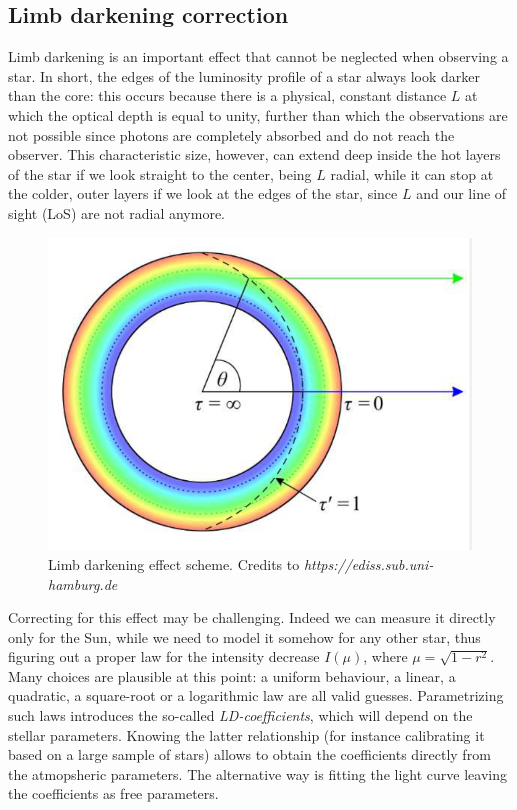 \documentclass[a4paper,11pt,twocolumn]{article}
\begin{document}

\subsection{Limb darkening correction}

Limb darkening is an important effect that cannot be neglected when observing a star.
In short, the edges of the luminosity profile 
of a star always look darker than the core: this occurs because there is a physical, constant 
distance $L$ at which the optical depth is equal to unity, further than which 
the observations are not possible since photons are completely absorbed and do not reach the observer. This characteristic size, 
however, can extend deep inside the hot layers of the star if we look straight 
to the center, being $L$ radial, while it can stop at the colder, outer layers 
if we look at the edges of the star, since $L$ and our line of sight (LoS) are not radial 
anymore.
\begin{figure}[H]
    \centering  
    \includegraphics[scale=0.25, angle=0]{../pictures/limb_darkening.png}
    \caption{Limb darkening effect scheme. Credits to \textit{https://ediss.sub.uni-hamburg.de}}
\end{figure}
Correcting for this effect may be challenging. Indeed we can measure it 
directly only for the Sun, while we need to model it somehow for any other 
star, thus figuring out a proper law for the intensity decrease $I(\mu)$, 
where $\mu = \sqrt{1-r^2}$. Many choices are plausible at this point: a 
uniform behaviour, a linear, a quadratic, a square-root or a 
logarithmic law are all valid guesses. Parametrizing such laws introduces 
the so-called \textit{LD-coefficients}, which will depend on the stellar 
parameters. Knowing the latter relationship (for instance calibrating it 
based on a large sample of stars) allows to obtain the coefficients directly 
from the atmopsheric parameters. 
The alternative way is fitting the light curve leaving the coefficients as free parameters.
\end{document}
